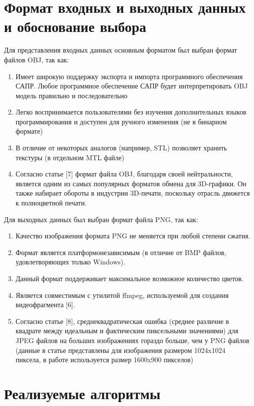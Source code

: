\documentclass[a4paper,14pt]{extreport}
\begin{document}
		\section{Формат входных и выходных данных и обоснование выбора}
		Для представления входных данных основным форматом был выбран 
формат файлов OBJ, так как:
		\begin{enumerate} 
        			\item Имеет широкую поддержку экспорта и импорта программного 
обеспечения САПР. Любое программное обеспечение САПР будет 
интерпретировать OBJ модель правильно и последовательно
			\item Легко воспринимается пользователями без изучения дополнительных 
языков программирования и доступен для ручного изменения (не в 
бинарном формате)
			\item В отличие от некоторых аналогов (например, STL) позволяет хранить 
текстуры (в отдельном MTL файле)
			\item Согласно статье [7] формат файла OBJ, благодаря своей нейтральности, является одним из самых популярных форматов обмена для 3D-графики. Он также набирает обороты в индустрии 3D-печати, поскольку отрасль движется к полноцветной печати.
    		\end{enumerate} 
		Для выходных данных был выбран формат файла PNG, так как:
		\begin{enumerate} 
        			\item Качество изображения формата PNG не меняется при любой степени 
сжатия.
			\item Формат является платформонезависимым (в отличие от BMP
файлов, удовлетворяющих только Windows).
			\item Данный формат поддерживает максимальное возможное количество 
цветов.
			\item Является совместимым с утилитой ffmpeg, используемой для 
создания видеофрагмента [6].
			\item Согласно статье [8], среднеквадратическая ошибка (среднее 
различие в квадрате между идеальным и фактическим пиксельными 
значениями) для JPEG файлов на больших изображениях гораздо 
больше, чем у PNG файлов (данные в статье представлены для 
изображения размером 1024x1024 пиксела, в работе используется 
размер 1600x900 пикселов)
    		\end{enumerate} 


		\section{Реализуемые алгоритмы}
\end{document}

